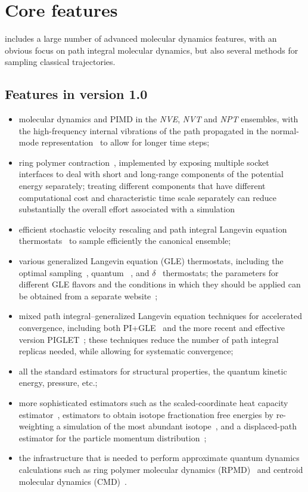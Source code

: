 \documentclass[11pt,english,fleqn]{report}
\begin{document}
\section{Core features}

\ipi{} includes a large number of advanced molecular dynamics features, with an obvious focus on path integral molecular dynamics, but also several methods for sampling classical trajectories.

\subsection{Features in version 1.0}
\begin{itemize}
\item molecular dynamics and PIMD in the {\em NVE}, {\em NVT} and {\em NPT} ensembles, with the high-frequency internal vibrations of the path propagated in the normal-mode representation~\cite{ceri+10jcp} {to allow for longer time steps};
\item ring polymer contraction~\cite{mark-mano08jcp,mark-mano08cpl}, implemented 
by exposing multiple socket interfaces to deal with short and long-range components of the potential energy separately; {treating different components that have different computational cost and characteristic time scale separately can reduce substantially the overall effort associated with a simulation}
\item efficient stochastic velocity rescaling \cite{buss+07jcp} and 
path integral Langevin equation thermostats~\cite{ceri+10jcp} {to sample efficiently the canonical ensemble}; 
\item various generalized Langevin equation (GLE) thermostats,
including the optimal sampling~\cite{ceri+09prl,ceri+10jctc}, quantum 
~\cite{ceri+09prl2}, and $\delta$~\cite{ceri-parr10pcs} thermostats; the parameters 
{for different GLE flavors and the conditions in which they should be applied can be obtained from a separate website~\cite{gle4md};}
\item mixed path integral--generalized Langevin equation techniques for 
accelerated convergence, including both PI+GLE~\cite{ceri+11jcp} and the 
more recent and effective version PIGLET~\cite{ceri-mano12prl}; {these techniques reduce the number of path integral replicas needed, while allowing for systematic convergence;}
\item all the standard estimators for structural properties, the quantum 
kinetic energy, pressure, etc.;
\item more sophisticated estimators such as the scaled-coordinate 
heat capacity estimator~\cite{yama05jcp}, 
estimators to obtain isotope fractionation free energies by re-weighting a 
simulation of the most abundant isotope~\cite{ceri-mark13jcp}, and 
a displaced-path estimator for the particle momentum distribution~\cite{lin+10prl};
\item the infrastructure that is needed to perform approximate quantum dynamics calculations such as ring polymer molecular dynamics (RPMD)~\cite{crai-mano04jcp,habe+13arpc} and centroid molecular dynamics
(CMD)~\cite{cao-voth93jcp,cao-voth94jcp}.
\end{itemize}
\end{document}
